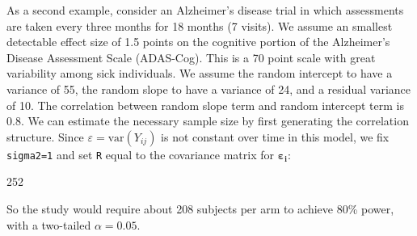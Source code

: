 \documentclass[12pt]{article}
\newcommand{\var}{\mathrm{var}}
\begin{document}
As a second example, consider an Alzheimer's disease trial in which assessments are taken every three months for 18 months (7 visits). We assume an smallest detectable effect size of 1.5 points on the cognitive portion of the Alzheimer's Disease Assessment Scale (ADAS-Cog). This is a 70 point scale with great variability among sick individuals. We assume the random intercept to have a variance of 55, the random slope to have a variance of 24, and a residual variance of 10. The correlation between random slope term and random intercept term is 0.8. We can estimate the necessary sample size by first generating the correlation structure. Since $\varepsilon = \var(Y_{ij})$ is not constant over time in this model, we fix \texttt{sigma2=1} and set \texttt{R} equal to the covariance matrix for $\bm{\varepsilon_i}$:
\begin{Schunk}
\begin{Soutput}
[1] 252
\end{Soutput}
\end{Schunk}
So the study would require about 208 subjects per arm to achieve 80\% power, with a two-tailed $\alpha=0.05$.
\end{document}
